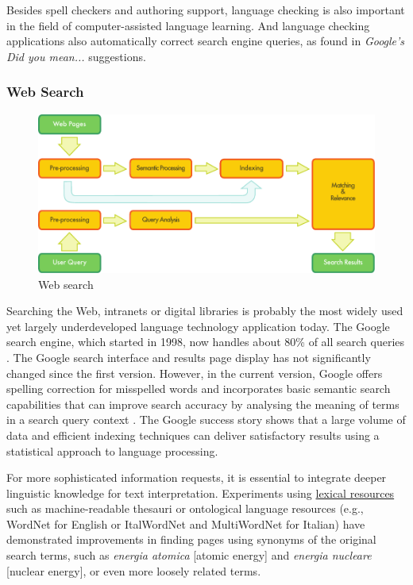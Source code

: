 \documentclass[]{../../metanetpaper}
\begin{document}
\begin{multicols}{2}


Besides spell checkers and authoring support, language checking is also important in the field of computer-assisted language learning. And language checking applications also automatically correct search engine queries, as found in \emph{Google's Did you mean...} suggestions.


\subsubsection{Web Search}

\begin{figure}[htb]
  \center
  \includegraphics[width=\textwidth]{../_media/english/web_search_architecture}
  \caption{Web search}
  \label{fig:websearcharch_en}
 \end{figure}

Searching the Web, intranets or digital libraries is probably the most widely used yet largely underdeveloped language technology application today. The Google search engine, which started in 1998, now handles about 80\% of all search queries \cite{spi1}. The Google search interface and results page display has not significantly changed since the first version. However, in the current version, Google offers spelling correction for misspelled words and incorporates basic semantic search capabilities that can improve search accuracy by analysing the meaning of terms in a search query context \cite{pc1}. The Google success story shows that a large volume of data and efficient indexing techniques can deliver satisfactory results using a statistical approach to language processing. 

For more sophisticated information requests, it is essential to integrate deeper linguistic knowledge for text interpretation. Experiments using \underline{lexical resources} such as machine-readable thesauri or ontological language resources (e.g., WordNet for English or ItalWordNet and MultiWordNet for Italian) have demonstrated improvements in finding pages using synonyms of the original search terms, such as \emph{energia atomica} [atomic energy] and \emph{energia nucleare} [nuclear energy], or even more loosely related terms.



\end{multicols}
\end{document}
